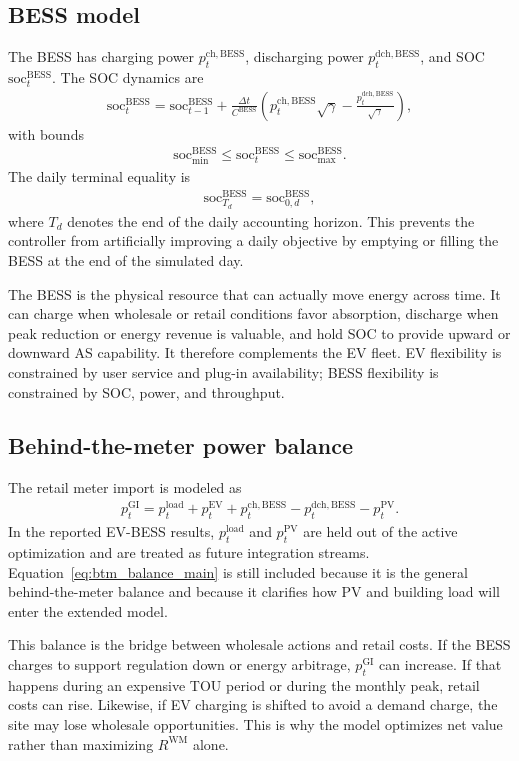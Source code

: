 \documentclass[final,5p,times]{elsarticle}
\newcommand{\DeltaT}{\Delta t}
\newcommand{\EV}{\mathrm{EV}}
\newcommand{\BESS}{\mathrm{BESS}}
\newcommand{\GI}{\mathrm{GI}}
\newcommand{\PV}{\mathrm{PV}}
\newcommand{\load}{\mathrm{load}}
\newcommand{\soc}{\mathrm{soc}}
\newcommand{\WM}{\mathrm{WM}}
\newcommand{\ch}{\mathrm{ch}}
\newcommand{\dch}{\mathrm{dch}}
\begin{document}
\subsection{BESS model}
The BESS has charging power $p_t^{\ch,\BESS}$, discharging power $p_t^{\dch,\BESS}$, and SOC $\soc_t^{\BESS}$. The SOC dynamics are
\begin{align}
\soc_t^{\BESS}=\soc_{t-1}^{\BESS}+\frac{\DeltaT}{C^{\BESS}}
\left(p_t^{\ch,\BESS}\sqrt{\gamma}-\frac{p_t^{\dch,\BESS}}{\sqrt{\gamma}}\right),
\label{eq:bess_soc_main}
\end{align}
with bounds
\begin{align}
\soc_{\min}^{\BESS}\le \soc_t^{\BESS}\le \soc_{\max}^{\BESS}.
\label{eq:bess_soc_bound_main}
\end{align}
The daily terminal equality is
\begin{align}
\soc_{T_d}^{\BESS}=\soc_{0,d}^{\BESS},
\label{eq:bess_terminal_main}
\end{align}
where $T_d$ denotes the end of the daily accounting horizon. This prevents the controller from artificially improving a daily objective by emptying or filling the BESS at the end of the simulated day.

The BESS is the physical resource that can actually move energy across time. It can charge when wholesale or retail conditions favor absorption, discharge when peak reduction or energy revenue is valuable, and hold SOC to provide upward or downward AS capability. It therefore complements the EV fleet. EV flexibility is constrained by user service and plug-in availability; BESS flexibility is constrained by SOC, power, and throughput.

\subsection{Behind-the-meter power balance}
The retail meter import is modeled as
\begin{align}
p_t^{\GI}=p_t^{\load}+p_t^{\EV}+p_t^{\ch,\BESS}-p_t^{\dch,\BESS}-p_t^{\PV}.
\label{eq:btm_balance_main}
\end{align}
In the reported EV-BESS results, $p_t^{\load}$ and $p_t^{\PV}$ are held out of the active optimization and are treated as future integration streams. Equation~\eqref{eq:btm_balance_main} is still included because it is the general behind-the-meter balance and because it clarifies how PV and building load will enter the extended model.

This balance is the bridge between wholesale actions and retail costs. If the BESS charges to support regulation down or energy arbitrage, $p_t^{\GI}$ can increase. If that happens during an expensive TOU period or during the monthly peak, retail costs can rise. Likewise, if EV charging is shifted to avoid a demand charge, the site may lose wholesale opportunities. This is why the model optimizes net value rather than maximizing $R^{\WM}$ alone.
\end{document}

